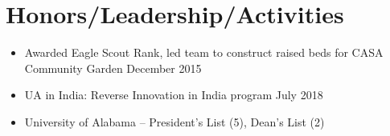 \documentclass[hidelinks, 11pt]{article}
\begin{document}
\section{Honors/Leadership/Activities}

\begin{itemize}
	\item Awarded Eagle Scout Rank, led team to construct raised beds for CASA Community Garden \hfill December 2015
	\item UA in India: Reverse Innovation in India program \hfill July 2018
	\item University of Alabama -- President's List (5), Dean's List (2)
\end{itemize}
\end{document}

